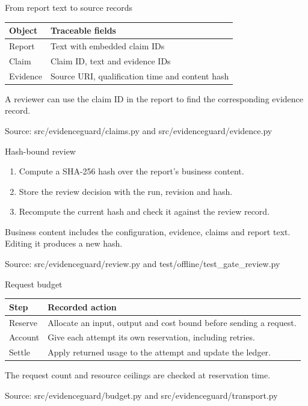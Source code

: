 \documentclass[aspectratio=169,11pt,t]{beamer}
\newcommand{\source}[1]{\par\vfill{\fontsize{6.6}{8}\selectfont\color{CityUMuted}Source: #1\par}}
\begin{document}
\begin{frame}{From report text to source records}
 \small
 \begin{tabularx}{\textwidth}{@{}L{.26\textwidth}Y@{}}
 \toprule Object & Traceable fields\\\midrule
 Report & Text with embedded claim IDs\\[6pt]
 Claim & Claim ID, text and evidence IDs\\[6pt]
 Evidence & Source URI, qualification time and content hash\\\bottomrule
 \end{tabularx}
 \par\medskip\normalsize
 A reviewer can use the claim ID in the report to find the corresponding evidence record.
 \source{src/evidenceguard/claims.py and src/evidenceguard/evidence.py}
\end{frame}

\begin{frame}{Hash-bound review}
 \begin{enumerate}\setlength\itemsep{9pt}
 \item Compute a SHA-256 hash over the report's business content.
 \item Store the review decision with the run, revision and hash.
 \item Recompute the current hash and check it against the review record.
 \end{enumerate}
 \medskip Business content includes the configuration, evidence, claims and report text. Editing it produces a new hash.
 \source{src/evidenceguard/review.py and test/offline/test\_gate\_review.py}
\end{frame}

\begin{frame}{Request budget}
 \small
 \begin{tabularx}{\textwidth}{@{}L{.28\textwidth}Y@{}}
 \toprule Step & Recorded action\\\midrule
 Reserve & Allocate an input, output and cost bound before sending a request.\\[6pt]
 Account & Give each attempt its own reservation, including retries.\\[6pt]
 Settle & Apply returned usage to the attempt and update the ledger.\\\bottomrule
 \end{tabularx}
 \par\medskip\normalsize The request count and resource ceilings are checked at reservation time.
 \source{src/evidenceguard/budget.py and src/evidenceguard/transport.py}
\end{frame}
\end{document}
